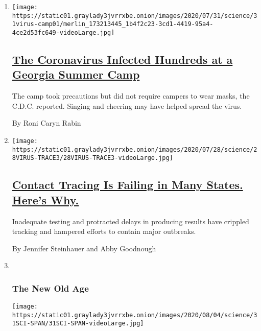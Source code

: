 \begin{enumerate}
\def\labelenumi{\arabic{enumi}.}
\item
  \texttt{[image: https://static01.graylady3jvrrxbe.onion/images/2020/07/31/science/31virus-camp01/merlin\_173213445\_1b4f2c23-3cd1-4419-95a4-4ce2d53fc649-videoLarge.jpg]}

  \hypertarget{the-coronavirus-infected-hundreds-at-a-georgia-summer-camp}{%
  \subsection{\texorpdfstring{\href{/2020/07/31/health/coronavirus-children-camp.html}{The
  Coronavirus Infected Hundreds at a Georgia Summer
  Camp}}{The Coronavirus Infected Hundreds at a Georgia Summer Camp}}\label{the-coronavirus-infected-hundreds-at-a-georgia-summer-camp}}

  The camp took precautions but did not require campers to wear masks,
  the C.D.C. reported. Singing and cheering may have helped spread the
  virus.

  By Roni Caryn Rabin
\item
  \texttt{[image: https://static01.graylady3jvrrxbe.onion/images/2020/07/28/science/28VIRUS-TRACE3/28VIRUS-TRACE3-videoLarge.jpg]}

  \hypertarget{contact-tracing-is-failing-in-many-states-heres-why}{%
  \subsection{\texorpdfstring{\href{/2020/07/31/health/covid-contact-tracing-tests.html}{Contact
  Tracing Is Failing in Many States. Here's
  Why.}}{Contact Tracing Is Failing in Many States. Here's Why.}}\label{contact-tracing-is-failing-in-many-states-heres-why}}

  Inadequate testing and protracted delays in producing results have
  crippled tracking and hampered efforts to contain major outbreaks.

  By Jennifer Steinhauer and Abby Goodnough
\item ~
  \hypertarget{the-new-old-age}{%
  \subsubsection{The New Old Age}\label{the-new-old-age}}

  \texttt{[image: https://static01.graylady3jvrrxbe.onion/images/2020/08/04/science/31SCI-SPAN/31SCI-SPAN-videoLarge.jpg]}


\end{enumerate}
